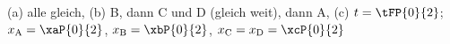 (a) alle gleich, (b) B, dann C und D (gleich weit), dann A, (c) $t = \tFP{0}{2}$; $x_\mathrm{A} = \xaP{0}{2}$, $x_\mathrm{B} = \xbP{0}{2}$, $x_\mathrm{C} = x_\mathrm{D} = \xcP{0}{2}$
